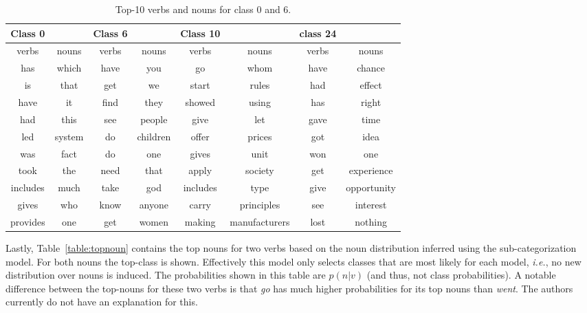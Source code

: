 \documentclass[11pt]{scrartcl}
\newcommand{\ie}{\textit{i.e.}}
\begin{document}
\begin{table}
  \centering
  \begin{tabular}{c c c c c c c c}
    \toprule
    Class 0 & & Class 6 & & Class 10 & & class 24 & \\
    \midrule
    verbs & nouns & verbs & nouns & verbs & nouns & verbs & nouns \\
    \midrule
    has      & which     & have   & you       & go         & whom           & have  & chance \\
    is       & that      & get    & we        & start      & rules          & had   & effect \\
    have     & it        & find   & they      & showed     & using          & has   & right \\
    had      & this      & see    & people    & give       & let            & gave  & time \\
    led      & system    & do     & children  & offer      & prices         & got   & idea \\
    was      & fact      & do     & one       & gives      & unit           & won   & one \\
    took     & the       & need   & that      & apply      & society        & get   & experience \\
    includes & much      & take   & god       & includes   & type           & give  & opportunity \\
    gives    & who       & know   & anyone    & carry      & principles     & see   & interest \\
    provides & one       & get    & women     & making     & manufacturers  & lost  & nothing \\
    \bottomrule
  \end{tabular}
  \caption{Top-10 verbs and nouns for class 0 and 6.}
  \label{table:top10}
  \end{table}

  Lastly, Table~\ref{table:topnoun} contains the top nouns for two
verbs based on the noun distribution inferred using the
sub-categorization model. For both nouns the top-class is
shown. Effectively this model only selects classes that are most
likely for each model, \ie, no new distribution over nouns is
induced. The probabilities shown in this table are $p(n|v)$ (and thus,
not class probabilities). A notable difference between the top-nouns
for these two verbs is that \textit{go} has much higher probabilities
for its top nouns than \textit{went}. The authors currently do not
have an explanation for this.
\end{document}
